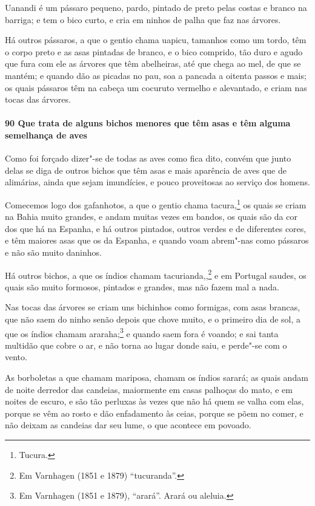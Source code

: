 \begin{linenumbers}
Uanandi é um pássaro pequeno, pardo, pintado de preto pelas costas e branco na barriga; e
tem o bico curto, e cria em ninhos de palha que faz nas árvores.

Há outros pássaros, a que o gentio chama uapicu, tamanhos como um tordo, têm o corpo preto
e as asas pintadas de branco, e o bico comprido, tão duro e agudo que fura com ele as
árvores que têm abelheiras, até que chega ao mel, de que se mantém; e quando dão as
picadas no pau, soa a pancada a oitenta passos e mais; os quais pássaros têm na cabeça um
cocuruto vermelho e alevantado, e criam nas tocas das árvores.

\paragraph{90 Que trata de alguns bichos menores que têm asas e têm alguma semelhança de
aves}\quad
Como foi forçado dizer"-se de todas as aves como fica dito, convém que junto delas se diga
de outros bichos que têm asas e mais aparência de aves que de alimárias, ainda que sejam
imundícies, e pouco proveitosas ao serviço dos homens.

Comecemos logo dos gafanhotos, a que o gentio chama tacura,\footnote{ Tucura.} os quais se
criam na Bahia muito grandes, e andam muitas vezes em bandos, os quais são da cor dos que
há na Espanha, e há outros pintados, outros verdes e de diferentes cores, e têm maiores
asas que os da Espanha, e quando voam abrem"-nas como pássaros e não são muito daninhos.

Há outros bichos, a que os índios chamam tacurianda,,\footnote{ Em Varnhagen (1851 e 1879)
``tucuranda''.} e em Portugal saudes, os quais são muito formosos, pintados e grandes,
mas não fazem mal a nada.

Nas tocas das árvores se criam uns bichinhos como formigas, com asas brancas, que não saem
do ninho senão depois que chove muito, e o primeiro dia de sol, a que os índios chamam
araraha;\footnote{ Em Varnhagen (1851 e 1879), ``arará''. Arará ou aleluia.} e quando saem
fora é voando; e sai tanta multidão que cobre o ar, e não torna ao lugar donde saiu, e
perde"-se com o vento.

As borboletas a que chamam mariposa, chamam os índios sarará; as quais andam de noite
derredor das candeias, maiormente em casas palhoças do mato, e em noites de escuro, e são
tão perluxas às vezes que não há quem se valha com elas, porque se vêm ao rosto e dão
enfadamento às ceias, porque se põem no comer, e não deixam as candeias dar seu lume, o
que acontece em povoado.


\end{linenumbers}
